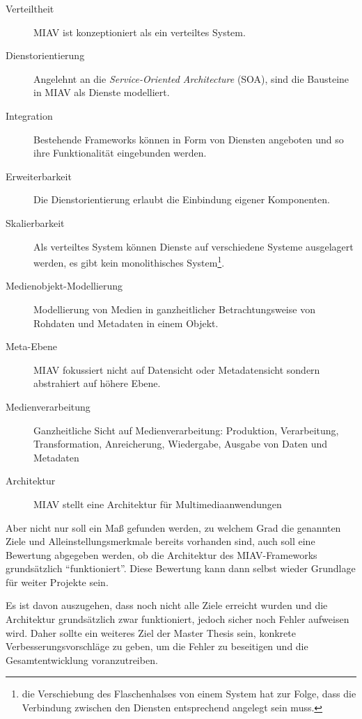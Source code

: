 \documentclass[12pt,headsepline,a4paper,bibtotoc,liststotoc,DIV12,BCOR12mm]{scrartcl}
\begin{document}
  \begin{description}
  	\item[Verteiltheit] MIAV ist konzeptioniert als ein verteiltes System.
  	\item[Dienstorientierung] Angelehnt an die \emph{Service-Oriented Architecture}  (SOA), sind die Bausteine in MIAV als Dienste modelliert.
  	\item[Integration] Bestehende Frameworks können in Form von Diensten angeboten und so ihre Funktionalität eingebunden werden.
  	\item[Erweiterbarkeit] Die Dienstorientierung erlaubt die Einbindung eigener Komponenten.
  	\item[Skalierbarkeit] Als verteiltes System können Dienste auf verschiedene Systeme ausgelagert werden, es gibt kein monolithisches System\footnote{die Verschiebung des Flaschenhalses von einem System hat zur Folge, dass die Verbindung zwischen den Diensten entsprechend angelegt sein muss.}.
  	\item[Medienobjekt-Modellierung] Modellierung von Medien in ganzheitlicher Betrachtungsweise von Rohdaten und Metadaten in einem Objekt.
  	\item[Meta-Ebene] MIAV fokussiert nicht auf Datensicht oder Metadatensicht sondern abstrahiert auf höhere Ebene.
  	\item[Medienverarbeitung] Ganzheitliche Sicht auf Medienverarbeitung: Produktion, Verarbeitung, Transformation, Anreicherung, Wiedergabe, Ausgabe von Daten und Metadaten
  	\item[Architektur] MIAV stellt eine Architektur für Multimediaanwendungen
  \end{description}
  
  Aber nicht nur soll ein Maß gefunden werden, zu welchem Grad die genannten Ziele und Alleinstellungsmerkmale bereits vorhanden sind, auch soll eine Bewertung abgegeben werden, ob die Architektur des MIAV-Frameworks grundsätzlich "`funktioniert"'. Diese Bewertung kann dann selbst wieder Grundlage für weiter Projekte sein.
  
  Es ist davon auszugehen, dass noch nicht alle Ziele erreicht wurden und die Architektur grundsätzlich zwar funktioniert, jedoch sicher noch Fehler aufweisen wird. Daher sollte ein weiteres Ziel der Master Thesis sein, konkrete Verbesserungsvorschläge zu geben, um die Fehler zu beseitigen und die Gesamtentwicklung voranzutreiben.
  
\end{document}
